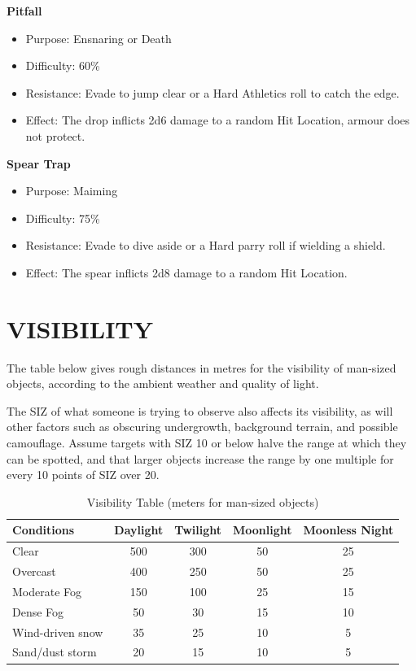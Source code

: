 \documentclass[10pt]{article}
\begin{document}
\textbf{Pitfall}
\begin{itemize}[leftmargin=*]
    \item Purpose: Ensnaring or Death
    \item Difficulty: 60\%
    \item Resistance: Evade to jump clear or a Hard Athletics roll to catch the edge.
    \item Effect: The drop inflicts 2d6 damage to a random Hit Location, armour does not protect.
\end{itemize}

\textbf{Spear Trap}
\begin{itemize}[leftmargin=*]
    \item Purpose: Maiming
    \item Difficulty: 75\%
    \item Resistance: Evade to dive aside or a Hard parry roll if wielding a shield.
    \item Effect: The spear inflicts 2d8 damage to a random Hit Location.
\end{itemize}

\section{VISIBILITY}
\label{sec:visibility}
The table below gives rough distances in metres for the visibility of man-sized objects, according to the ambient weather and quality of light.

The SIZ of what someone is trying to observe also affects its visibility, as will other factors such as obscuring undergrowth, background terrain, and possible camouflage. Assume targets with SIZ 10 or below halve the range at which they can be spotted, and that larger objects increase the range by one multiple for every 10 points of SIZ over 20.

\begin{table}[h]
\centering
\caption{Visibility Table (meters for man-sized objects)}
\label{tab:visibility}
\begin{tabular}{lcccc}
\toprule
\textbf{Conditions} & \textbf{Daylight} & \textbf{Twilight} & \textbf{Moonlight} & \textbf{Moonless Night} \\
\midrule
Clear & 500 & 300 & 50 & 25 \\
Overcast & 400 & 250 & 50 & 25 \\
Moderate Fog & 150 & 100 & 25 & 15 \\
Dense Fog & 50 & 30 & 15 & 10 \\
Wind-driven snow & 35 & 25 & 10 & 5 \\
Sand/dust storm & 20 & 15 & 10 & 5 \\
\bottomrule
\end{tabular}
\end{table}
\end{document}
